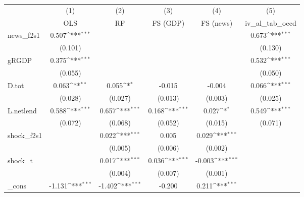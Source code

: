 {
\def\sym#1{\ifmmode^{#1}\else\(^{#1}\)\fi}
\begin{tabular}{l*{5}{c}}
\toprule
            &\multicolumn{1}{c}{(1)}&\multicolumn{1}{c}{(2)}&\multicolumn{1}{c}{(3)}&\multicolumn{1}{c}{(4)}&\multicolumn{1}{c}{(5)}\\
            &\multicolumn{1}{c}{OLS}&\multicolumn{1}{c}{RF}&\multicolumn{1}{c}{FS (GDP)}&\multicolumn{1}{c}{FS (news)}&\multicolumn{1}{c}{iv\_al\_tab\_oecd}\\
\midrule
news\_f2s1   &       0.507\sym{***}&                     &                     &                     &       0.673\sym{***}\\
            &     (0.101)         &                     &                     &                     &     (0.130)         \\
\addlinespace
gRGDP       &       0.375\sym{***}&                     &                     &                     &       0.532\sym{***}\\
            &     (0.055)         &                     &                     &                     &     (0.050)         \\
\addlinespace
D.tot       &       0.063\sym{**} &       0.055\sym{*}  &      -0.015         &      -0.004         &       0.066\sym{***}\\
            &     (0.028)         &     (0.027)         &     (0.013)         &     (0.003)         &     (0.025)         \\
\addlinespace
L.netlend   &       0.588\sym{***}&       0.657\sym{***}&       0.168\sym{***}&       0.027\sym{*}  &       0.549\sym{***}\\
            &     (0.072)         &     (0.068)         &     (0.052)         &     (0.015)         &     (0.071)         \\
\addlinespace
shock\_f2s1  &                     &       0.022\sym{***}&       0.005         &       0.029\sym{***}&                     \\
            &                     &     (0.005)         &     (0.006)         &     (0.002)         &                     \\
\addlinespace
shock\_t     &                     &       0.017\sym{***}&       0.036\sym{***}&      -0.003\sym{***}&                     \\
            &                     &     (0.004)         &     (0.007)         &     (0.001)         &                     \\
\addlinespace
\_cons      &      -1.131\sym{***}&      -1.402\sym{***}&      -0.200         &       0.211\sym{***}&                     \\

\end{tabular}}
